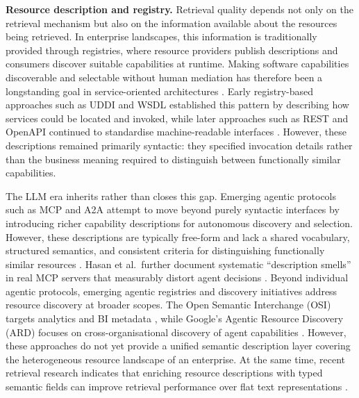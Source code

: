 \documentclass[10pt,twocolumn]{article}
\begin{document}
\textbf{Resource description and registry.} Retrieval quality depends not only on the retrieval mechanism but also on the information available about the resources being retrieved. In enterprise landscapes, this information is traditionally provided through registries, where resource providers publish descriptions and consumers discover suitable capabilities at runtime. Making software capabilities discoverable and selectable without human mediation has therefore been a longstanding goal in service-oriented architectures \citep{melzer_service-orientierte_2010}. Early registry-based approaches such as UDDI and WSDL established this pattern by describing how services could be located and invoked, while later approaches such as REST and OpenAPI continued to standardise machine-readable interfaces \citep{curbera_unraveling_2002,schwichtenberg_open_2017,pautasso_restful_2008,mazzara_microservices_2017}. However, these descriptions remained primarily syntactic: they specified invocation details rather than the business meaning required to distinguish between functionally similar capabilities.

The LLM era inherits rather than closes this gap. Emerging agentic protocols such as MCP and A2A attempt to move beyond purely syntactic interfaces by introducing richer capability descriptions for autonomous discovery and selection. However, these descriptions are typically free-form and lack a shared vocabulary, structured semantics, and consistent criteria for distinguishing functionally similar resources \citep{noauthor_specification_nodate,catalog_ai_nodate}. Hasan et al.\ further document systematic ``description smells'' in real MCP servers that measurably distort agent decisions \citep{hasan_model_2026}. Beyond individual agentic protocols, emerging agentic registries and discovery initiatives address resource discovery at broader scopes. The Open Semantic Interchange (OSI) targets analytics and BI metadata \citep{the_open_semantic_interchange_authors_open_nodate}, while Google's Agentic Resource Discovery (ARD) focuses on cross-organisational discovery of agent capabilities \citep{bu_announcing_nodate}. However, these approaches do not yet provide a unified semantic description layer covering the heterogeneous resource landscape of an enterprise. At the same time, recent retrieval research indicates that enriching resource descriptions with typed semantic fields can improve retrieval performance over flat text representations \citep{tang_multi-field_2026,lu_tools_2026}.
\end{document}

